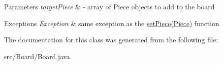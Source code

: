 \begin{DoxyParams}{Parameters}
{\em target\-Piece} & -\/ array of Piece objects to add to the board \\
\hline
\end{DoxyParams}

\begin{DoxyExceptions}{Exceptions}
{\em Exception} & same exception as the \hyperlink{classBoard_1_1Board_aec610c37f3e800806daa464a45b48762}{set\-Piece(\-Piece)} function \\
\hline
\end{DoxyExceptions}


The documentation for this class was generated from the following file\-:\begin{DoxyCompactItemize}
\item 
src/\-Board/Board.\-java\end{DoxyCompactItemize}
